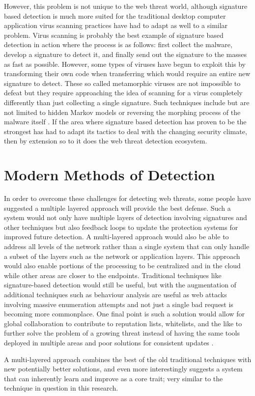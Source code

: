 However, this problem is not unique to the web threat world, although signature based detection is much more suited for the traditional desktop computer application virus scanning practices have had to adapt as well to a similar problem.  Virus scanning is probably the best example of signature based detection in action where the process is as follows: first collect the malware, develop a signature to detect it, and finally send out the signature to the masses as fast as possible.  However, some types of viruses have begun to exploit this by transforming their own code when transferring which would require an entire new signature to detect.  These so called metamorphic viruses are not impossible to defeat but they require approaching the idea of scanning for a virus completely differently than just collecting a single signature.  Such techniques include but are not limited to hidden Markov models or reversing the morphing process of the malware itself \cite{metaInvincible, metaHunting}.  If the area where signature based detection has proven to be the strongest has had to adapt its tactics to deal with the changing security climate, then by extension so to it does the web threat detection ecosystem.

\section{Modern Methods of Detection}

In order to overcome these challenges for detecting web threats, some people have suggested a multiple layered approach will provide the best defense.  Such a system would not only have multiple layers of detection involving signatures and other techniques but also feedback loops to update the protection systems for improved future detection.  A multi-layered approach would also be able to address all levels of the network rather than a single system that can only handle a subset of the layers such as the network or application layers.  This approach would also enable portions of the processing to be centralized and in the cloud while other areas are closer to the endpoints.  Traditional techniques like signature-based detection would still be useful, but with the augmentation of additional techniques such as behaviour analysis are useful as web attacks involving massive enumeration attempts and not just a single bad request is becoming more commonplace.  One final point is such a solution would allow for global collaboration to contribute to reputation lists, whitelists, and the like to further solve the problem of a growing threat instead of having the same tools deployed in multiple areas and poor solutions for consistent updates \cite{trendMicro}.

A multi-layered approach combines the best of the old traditional techniques with new potentially better solutions, and even more interestingly suggests a system that can inherently learn and improve as a core trait; very similar to the technique in question in this research.
